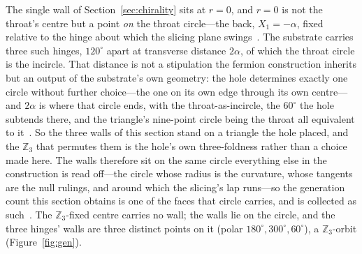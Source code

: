 \documentclass[11pt]{article}
\begin{document}
The single wall of Section~\ref{sec:chirality} sits at $r=0$, and $r=0$ is not the throat's centre but a point \emph{on} the throat circle---the back, $X_1=-\alpha$, fixed relative to the hinge about which the slicing plane swings~\cite{JanzenSlicing}. The substrate carries three such hinges, $120^\circ$ apart at transverse distance $2\alpha$, of which the throat circle is the incircle. That distance is not a stipulation the fermion construction inherits but an output of the substrate's own geometry: the hole determines exactly one circle without further choice---the one on its own edge through its own centre---and $2\alpha$ is where that circle ends, with the throat-as-incircle, the $60^{\circ}$ the hole subtends there, and the triangle's nine-point circle being the throat all equivalent to it~\cite{JanzenSlicing}. So the three walls of this section stand on a triangle the hole placed, and the $\mathbb{Z}_3$ that permutes them is the hole's own three-foldness rather than a choice made here. The walls therefore sit on the same circle everything else in the construction is read off---the circle whose radius is the curvature, whose tangents are the null rulings, and around which the slicing's lap runs---so the generation count this section obtains is one of the faces that circle carries, and is collected as such~\cite{JanzenGeometricCore}. The $\mathbb{Z}_3$-fixed centre carries no wall; the walls lie on the circle, and the three hinges' walls are three distinct points on it (polar $180^\circ,300^\circ,60^\circ$), a $\mathbb{Z}_3$-orbit (Figure~\ref{fig:gen}).
\end{document}
